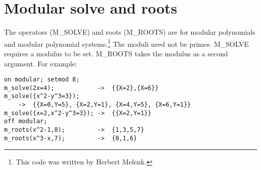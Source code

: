 \section{Modular solve and roots}

\hypertarget{operator:M_SOLVE}{}
\hypertarget{operator:M_ROOTS}{}
The operators (M\_SOLVE) and roots (M\_ROOTS) are for
modular polynomials and modular polynomial systems.\footnote{This code was written by Herbert Melenk.}  The moduli need not
be primes. M\_SOLVE requires a modulus to be set.  M\_ROOTS takes the
modulus as a second argument. For example:

\begin{verbatim}
on modular; setmod 8;
m_solve(2x=4);            ->  {{X=2},{X=6}}
m_solve({x^2-y^3=3});
    ->  {{X=0,Y=5}, {X=2,Y=1}, {X=4,Y=5}, {X=6,Y=1}}
m_solve({x=2,x^2-y^3=3}); ->  {{X=2,Y=1}}
off modular;
m_roots(x^2-1,8);         ->  {1,3,5,7}
m_roots(x^3-x,7);         ->  {0,1,6}
\end{verbatim}


